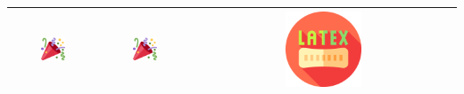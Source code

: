 \documentclass{article}
\begin{document}
\begin{table}
\begin{tabular}{|c|c|c|}
	\includegraphics[width=0.3\textwidth]{tw-tada} & \includegraphics[width=0.3\textwidth]{tw-tada} & \includegraphics[width=0.3\textwidth]{latex} \\\hline
\end{tabular}
\end{table}
\end{document}

